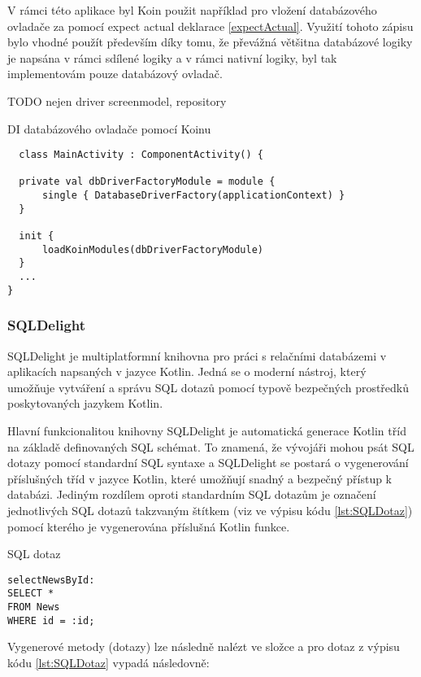 \bigskip

V rámci této aplikace byl Koin použit například pro vložení databázového ovladače za pomocí expect actual deklarace \ref{expectActual}.
Využití tohoto zápisu bylo vhodné použít především díky tomu, že převážná většitna databázové logiky je napsána v rámci sdílené 
logiky a v rámci nativní logiky, byl tak implementovám pouze databázový ovladač.

TODO nejen driver screenmodel, repository
\begin{listing}[H][H]
\caption{DI databázového ovladače pomocí Koinu}\label{lst:KoinInit}
\begin{verbatim}
  class MainActivity : ComponentActivity() {

  private val dbDriverFactoryModule = module {
      single { DatabaseDriverFactory(applicationContext) }
  }

  init {
      loadKoinModules(dbDriverFactoryModule)
  }
  ...
}
\end{verbatim}
\end{listing}

\subsubsection*{SQLDelight}
SQLDelight je multiplatformní knihovna pro práci s relačními databázemi v aplikacích napsaných v jazyce Kotlin. Jedná se o moderní nástroj, 
který umožňuje vytváření a správu SQL dotazů pomocí typově bezpečných prostředků poskytovaných jazykem Kotlin.

Hlavní funkcionalitou knihovny SQLDelight je automatická generace Kotlin tříd na základě definovaných SQL schémat. To znamená, že vývojáři
 mohou psát SQL dotazy pomocí standardní SQL syntaxe a SQLDelight se postará o vygenerování příslušných tříd v jazyce Kotlin, které umožňují 
 snadný a bezpečný přístup k databázi. Jediným rozdílem oproti standardním SQL dotazům je označení jednotlivých SQL dotazů takzvaným 
 štítkem (viz  ve výpisu kódu \ref{lst:SQLDotaz}) pomocí kterého je vygenerována příslušná Kotlin funkce. 

\begin{listing}[H]
\caption{SQL dotaz}\label{lst:SQLDotaz}
\begin{verbatim}
selectNewsById:
SELECT *
FROM News
WHERE id = :id;
\end{verbatim}
\end{listing}


Vygenerové metody (dotazy) lze následně nalézt ve složce  a pro dotaz z výpisu kódu \ref{lst:SQLDotaz}
vypadá následovně:

